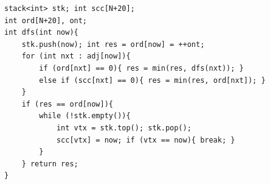 \begin{verbatim}
stack<int> stk; int scc[N+20];
int ord[N+20], ont;
int dfs(int now){
	stk.push(now); int res = ord[now] = ++ont;
	for (int nxt : adj[now]){
		if (ord[nxt] == 0){ res = min(res, dfs(nxt)); }
		else if (scc[nxt] == 0){ res = min(res, ord[nxt]); }
	}
	if (res == ord[now]){
		while (!stk.empty()){
			int vtx = stk.top(); stk.pop();
			scc[vtx] = now; if (vtx == now){ break; }
		}
	} return res;
}
\end{verbatim}